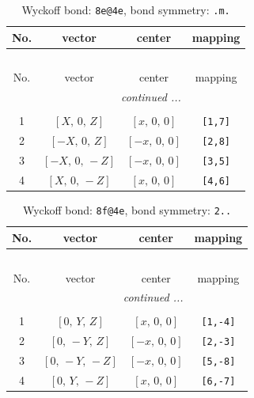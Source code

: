 \documentclass[fleqn,8pt]{jsarticle}
\begin{document}
\renewcommand{\arraystretch}{1.2}
\begin{longtable}{cccc}
\caption{Wyckoff bond: {\tt 8e@4e}, bond symmetry: {\tt .m.}}
 \\
 \hline \hline
No. & vector & center & mapping \\ \hline \endfirsthead

\multicolumn{3}{l}{\tablename\ \thetable{}} \\
 \hline \hline
No. & vector & center & mapping \\ \hline \endhead

 \hline \hline
\multicolumn{3}{r}{\footnotesize\it continued ...} \\ \endfoot

 \hline \hline
\multicolumn{3}{r}{} \\ \endlastfoot

1 & $\left[ X,\, 0,\, Z \right]$ & $\left[ x,\, 0,\, 0 \right]$ & {\tt [1,7]} \\ \hline
2 & $\left[ - X,\, 0,\, Z \right]$ & $\left[ - x,\, 0,\, 0 \right]$ & {\tt [2,8]} \\ \hline
3 & $\left[ - X,\, 0,\, - Z \right]$ & $\left[ - x,\, 0,\, 0 \right]$ & {\tt [3,5]} \\ \hline
4 & $\left[ X,\, 0,\, - Z \right]$ & $\left[ x,\, 0,\, 0 \right]$ & {\tt [4,6]} \\
\end{longtable}
\renewcommand{\arraystretch}{1.2}
\begin{longtable}{cccc}
\caption{Wyckoff bond: {\tt 8f@4e}, bond symmetry: {\tt 2..}}
 \\
 \hline \hline
No. & vector & center & mapping \\ \hline \endfirsthead

\multicolumn{3}{l}{\tablename\ \thetable{}} \\
 \hline \hline
No. & vector & center & mapping \\ \hline \endhead

 \hline \hline
\multicolumn{3}{r}{\footnotesize\it continued ...} \\ \endfoot

 \hline \hline
\multicolumn{3}{r}{} \\ \endlastfoot

1 & $\left[ 0,\, Y,\, Z \right]$ & $\left[ x,\, 0,\, 0 \right]$ & {\tt [1,-4]} \\ \hline
2 & $\left[ 0,\, - Y,\, Z \right]$ & $\left[ - x,\, 0,\, 0 \right]$ & {\tt [2,-3]} \\ \hline
3 & $\left[ 0,\, - Y,\, - Z \right]$ & $\left[ - x,\, 0,\, 0 \right]$ & {\tt [5,-8]} \\ \hline
4 & $\left[ 0,\, Y,\, - Z \right]$ & $\left[ x,\, 0,\, 0 \right]$ & {\tt [6,-7]} \\
\end{longtable}
\end{document}
